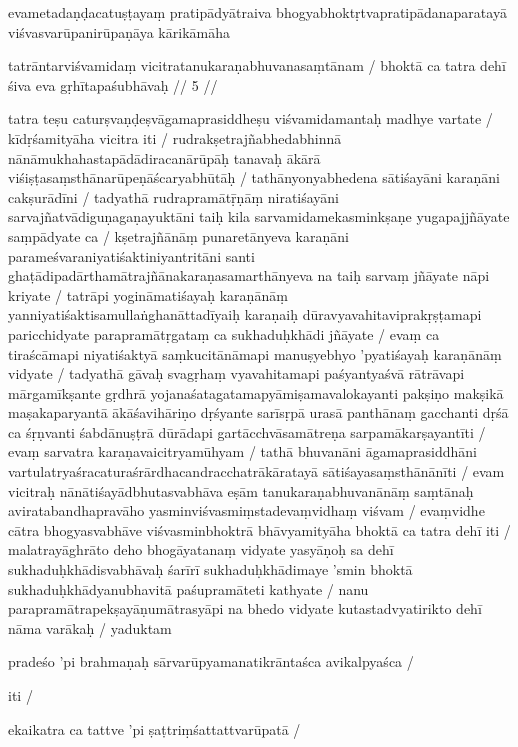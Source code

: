 evametadaṇḍacatuṣṭayaṃ pratipādyātraiva bhogyabhoktṛtvapratipādanaparatayā viśvasvarūpanirūpaṇāya kārikāmāha

tatrāntarviśvamidaṃ vicitratanukaraṇabhuvanasaṃtānam  /
bhoktā ca tatra dehī śiva eva gṛhītapaśubhāvaḥ  // 5  //

tatra teṣu caturṣvaṇḍeṣvāgamaprasiddheṣu viśvamidamantaḥ madhye vartate  / kīdṛśamityāha vicitra iti  / rudrakṣetrajñabhedabhinnā nānāmukhahastapādādiracanārūpāḥ tanavaḥ ākārā viśiṣṭasaṃsthānarūpeṇāścaryabhūtāḥ  / tathānyonyabhedena sātiśayāni karaṇāni cakṣurādīni  / tadyathā rudrapramātṝṇāṃ niratiśayāni sarvajñatvādiguṇagaṇayuktāni taiḥ kila sarvamidamekasminkṣaṇe yugapajjñāyate saṃpādyate ca  / kṣetrajñānāṃ punaretānyeva karaṇāni parameśvaraniyatiśaktiniyantritāni santi ghaṭādipadārthamātrajñānakaraṇasamarthānyeva na taiḥ sarvaṃ jñāyate nāpi kriyate  / tatrāpi yogināmatiśayaḥ karaṇānāṃ yanniyatiśaktisamullaṅghanāttadīyaiḥ karaṇaiḥ dūravyavahitaviprakṛṣṭamapi paricchidyate parapramātṛgataṃ ca sukhaduḥkhādi jñāyate  / evaṃ ca tiraścāmapi niyatiśaktyā saṃkucitānāmapi manuṣyebhyo 'pyatiśayaḥ karaṇānāṃ vidyate  / tadyathā gāvaḥ svagṛhaṃ vyavahitamapi paśyantyaśvā rātrāvapi mārgamīkṣante gṛdhrā yojanaśatagatamapyāmiṣamavalokayanti pakṣiṇo makṣikā maṣakaparyantā ākāśavihāriṇo dṛśyante sarīsṛpā urasā panthānaṃ gacchanti dṛśā ca śṛṇvanti śabdānuṣṭrā dūrādapi gartācchvāsamātreṇa sarpamākarṣayantīti  / evaṃ sarvatra karaṇavaicitryamūhyam  / tathā bhuvanāni āgamaprasiddhāni vartulatryaśracaturaśrārdhacandracchatrākāratayā sātiśayasaṃsthānānīti  / evam vicitraḥ nānātiśayādbhutasvabhāva eṣām tanukaraṇabhuvanānāṃ saṃtānaḥ aviratabandhapravāho yasminviśvasmiṃstadevaṃvidhaṃ viśvam  / evaṃvidhe cātra bhogyasvabhāve viśvasminbhoktrā bhāvyamityāha bhoktā ca tatra dehī iti  / malatrayāghrāto deho bhogāyatanaṃ vidyate yasyāṇoḥ sa dehī sukhaduḥkhādisvabhāvaḥ śarīrī sukhaduḥkhādimaye 'smin bhoktā sukhaduḥkhādyanubhavitā paśupramāteti kathyate  / nanu parapramātrapekṣayāṇumātrasyāpi na bhedo vidyate kutastadvyatirikto dehī nāma varākaḥ  / yaduktam

pradeśo 'pi brahmaṇaḥ sārvarūpyamanatikrāntaśca avikalpyaśca  /

iti  /

ekaikatra ca tattve 'pi ṣaṭtriṃśattattvarūpatā  /

